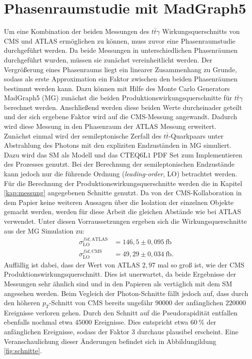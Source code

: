 \section{Phasenraumstudie mit MadGraph5}
\label{phasencms}
Um eine Kombination der beiden Messungen des $t\bar{t}\gamma$ Wirkungsquerschnitts von CMS und ATLAS ermöglichen zu können, muss zuvor eine Phasenraumstudie durchgeführt werden. Da beide Messungen in unterschiedlichen Phasenräumen durchgeführt wurden, müssen sie zunächst vereinheitlicht werden.
Der Vergrößerung eines Phasenraums liegt ein linearer Zusammenhang zu Grunde, sodass als erste Approximation ein Faktor zwischen den beiden Phasenräumen bestimmt werden kann. Dazu können mit Hilfe des Monte Carlo Generators MadGraph5\cite{Alwall:2014hca} (MG) zunächst die beiden Produktionswirkungsquerschnitte für $t\bar{t}\gamma$ berechnet werden.
Anschließend werden diese beiden Werte durcheinader geteilt und der sich ergebene Faktor wird auf die CMS-Messung angewandt. Dadurch wird diese Messung in den Phasenraum der ATLAS Messung erweitert.\\
Zunächst einmal wird der semileptonische Zerfall des $t\bar{t}$-Quarkpaars unter Abstrahlung des Photons mit den expliziten Endzuständen in MG simuliert. Dazu wird das SM als Modell und das $\text{CTEQ}6\text{L}1$ PDF Set\cite{Paakkinen:2018zbs} zum Implementieren des Prozesses genutzt. Bei der Berechnung der semileptonischen Endzustände kann jedoch nur die führende Ordnung (\textit{leading-order}, LO) betrachtet werden. Für die Berechnung der Produktionswirkungsquerschnitte werden die in Kapitel \ref{kap:messung} angegebenen Schnitte genutzt. Da von der CMS-Kollaboration in dem Papier keine weiteren Aussagen über die Isolation der einzelnen Objekte gemacht werden, werden für diese Arbeit die gleichen Abstände wie bei ATLAS verwendet. Unter diesen Vorraussetzungen ergeben sich die Wirkungsquerschnitte aus der MG Simulation zu:
\begin{align}
  \sigma^{fid, \text{ATLAS}}_{\text{LO}} &= 146,5 \pm 0,095~ \si{\femto\barn}\\
  \sigma^{fid, \text{CMS}}_{\text{LO}} &= 49,29 \pm 0,034~ \si{\femto\barn}.
\end{align}
Auffällig ist dabei, dass der Wert von ATLAS $2,97$ mal so groß ist, wie der CMS Produktionswirkungsquerschnitt. Dies ist unerwartet, da beide Ergebnisse der Messungen sehr ähnlich sind und in den Papieren als vertäglich mit dem SM angesehen werden.
Beim Vegleich der Photon-Schnitte fällt jedoch auf, dass durch den höheren $p_T$-Schnitt von CMS bereits ungefähr $90000$ der anfänglichen $220000$ Ereignisse verloren gehen. Durch den Schnitt auf die Pseudorapidität entfallen ebenfalls nochmal etwa $45000$ Ereignisse. Dies entspricht etwa $\SI{60}{\percent}$ der anfänglichen Ereignisse, sodass der Faktor $3$ durchaus plausibel erscheint. Eine Veranschaulichung dieser Änderungen befindet sich in Abbildungildung \ref{fig:schnitte}.\\
